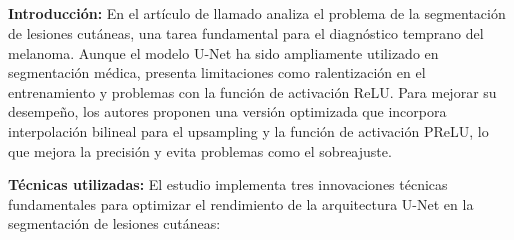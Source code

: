 \subsection{}

\textbf{Introducción:}
En el artículo de \cite{karshiev2020improved} llamado  analiza el problema de la segmentación de lesiones cutáneas, una tarea fundamental para el diagnóstico temprano del melanoma. Aunque el modelo U-Net ha sido ampliamente utilizado en segmentación médica, presenta limitaciones como ralentización en el entrenamiento y problemas con la función de activación ReLU. Para mejorar su desempeño, los autores proponen una versión optimizada que incorpora interpolación bilineal para el upsampling y la función de activación PReLU, lo que mejora la precisión y evita problemas como el sobreajuste.

\textbf{Técnicas utilizadas:}
El estudio implementa tres innovaciones técnicas fundamentales para optimizar el rendimiento de la arquitectura U-Net en la segmentación de lesiones cutáneas:

